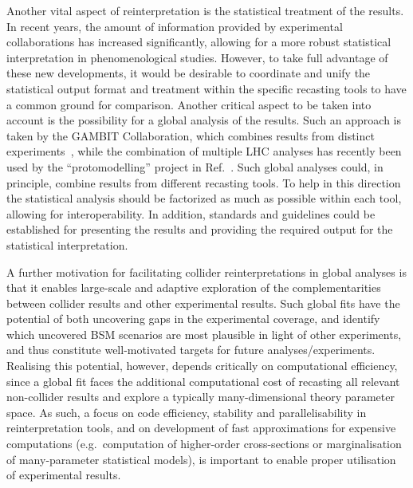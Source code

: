 \documentclass[11pt]{article}
\begin{document}
Another vital aspect of reinterpretation is the statistical treatment of the results. In recent years, the amount of information provided by experimental collaborations has increased significantly, allowing for a more robust statistical interpretation in phenomenological studies. However, to take full advantage of these new developments, it would be desirable to coordinate and unify the statistical output format and treatment within the specific recasting tools to have a common ground for comparison. Another critical aspect to be taken into account is the possibility for a global analysis of the results. Such an approach is taken by the GAMBIT Collaboration, which combines results from distinct experiments~\cite{Kvellestad:2019vxm}, while the combination of multiple \gls{LHC} analyses has recently been used by the ``protomodelling'' project in Ref.~\cite{Waltenberger:2020ygp}. Such global analyses could, in principle, combine results from different recasting tools.
To help in this direction the statistical analysis should be factorized as much as possible within each tool, allowing for interoperability. In addition,  standards and guidelines could be established for presenting the results and providing the required output for the statistical interpretation.

A further motivation for facilitating collider reinterpretations in global analyses is that it enables large-scale and adaptive exploration of the complementarities between collider results and other experimental results. Such global fits have the potential of both uncovering gaps in the experimental coverage, and identify which uncovered \gls{BSM} scenarios are most plausible in light of other experiments, and thus constitute well-motivated targets for future analyses/experiments. Realising this potential, however, depends critically on computational efficiency, since a global fit faces the additional computational cost of \gls{recasting} all relevant non-collider results and explore a typically many-dimensional theory parameter space. As such, a focus on code efficiency, stability and parallelisability in reinterpretation tools, and on development of fast approximations for expensive computations (e.g.~computation of higher-order cross-sections or marginalisation of many-parameter statistical models), is important to enable proper utilisation of experimental results.
\end{document}
